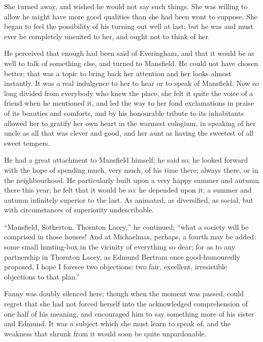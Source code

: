 \documentclass{article}
\begin{document}
She turned away, and wished he would not say such things.
She was willing to allow he might have more good
qualities than she had been wont to suppose.  She began
to feel the possibility of his turning out well at last;
but he was and must ever be completely unsuited to her,
and ought not to think of her.

He perceived that enough had been said of Everingham,
and that it would be as well to talk of something else,
and turned to Mansfield.  He could not have chosen better;
that was a topic to bring back her attention and her looks
almost instantly.  It was a real indulgence to her to hear
or to speak of Mansfield.  Now so long divided from
everybody who knew the place, she felt it quite the voice
of a friend when he mentioned it, and led the way to her
fond exclamations in praise of its beauties and comforts,
and by his honourable tribute to its inhabitants allowed
her to gratify her own heart in the warmest eulogium,
in speaking of her uncle as all that was clever and good,
and her aunt as having the sweetest of all sweet tempers.

He had a great attachment to Mansfield himself; he said so;
he looked forward with the hope of spending much, very much,
of his time there; always there, or in the neighbourhood.
He particularly built upon a very happy summer and
autumn there this year; he felt that it would be so:
he depended upon it; a summer and autumn infinitely superior
to the last.  As animated, as diversified, as social,
but with circumstances of superiority undescribable.

``Mansfield, Sotherton, Thornton Lacey,'' he continued;
``what a society will be comprised in those houses!
And at Michaelmas, perhaps, a fourth may be added:
some small hunting-box in the vicinity of everything so dear;
for as to any partnership in Thornton Lacey, as Edmund
Bertram once good-humouredly proposed, I hope I foresee
two objections:  two fair, excellent, irresistible objections
to that plan.''

Fanny was doubly silenced here; though when the moment
was passed, could regret that she had not forced herself into
the acknowledged comprehension of one half of his meaning,
and encouraged him to say something more of his sister
and Edmund.  It was a subject which she must learn to speak of,
and the weakness that shrunk from it would soon be quite
unpardonable.
\end{document}
